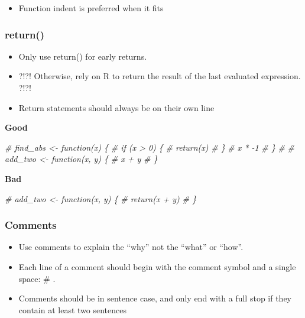 \documentclass[
]{article}
\newenvironment{Shaded}{\begin{snugshade}}{\end{snugshade}}
\newcommand{\CommentTok}[1]{\textcolor[rgb]{0.56,0.35,0.01}{\textit{#1}}}
\providecommand{\tightlist}{%
  \setlength{\itemsep}{0pt}\setlength{\parskip}{0pt}}
\begin{document}
\begin{itemize}
\tightlist
\item
  Function indent is preferred when it fits
\end{itemize}

\hypertarget{return}{%
\subsubsection{return()}\label{return}}

\begin{itemize}
\tightlist
\item
  Only use return() for early returns.
\item
  ?!?! Otherwise, rely on R to return the result of the last evaluated
  expression. ?!?!
\item
  Return statements should always be on their own line
\end{itemize}

\textbf{Good}

\begin{Shaded}
\begin{Highlighting}[]
\CommentTok{# find_abs <- function(x) \{}
\CommentTok{#   if (x > 0) \{}
\CommentTok{#     return(x)}
\CommentTok{#   \}}
\CommentTok{#   x * -1}
\CommentTok{# \}}
\CommentTok{# }
\CommentTok{# add_two <- function(x, y) \{}
\CommentTok{#   x + y}
\CommentTok{# \}}
\end{Highlighting}
\end{Shaded}

\textbf{Bad}

\begin{Shaded}
\begin{Highlighting}[]
\CommentTok{# add_two <- function(x, y) \{}
\CommentTok{#   return(x + y)}
\CommentTok{# \}}
\end{Highlighting}
\end{Shaded}

\hypertarget{comments-1}{%
\subsubsection{Comments}\label{comments-1}}

\begin{itemize}
\tightlist
\item
  Use comments to explain the ``why'' not the ``what'' or ``how''.
\item
  Each line of a comment should begin with the comment symbol and a
  single space: \# .
\item
  Comments should be in sentence case, and only end with a full stop if
  they contain at least two sentences
\end{itemize}
\end{document}
